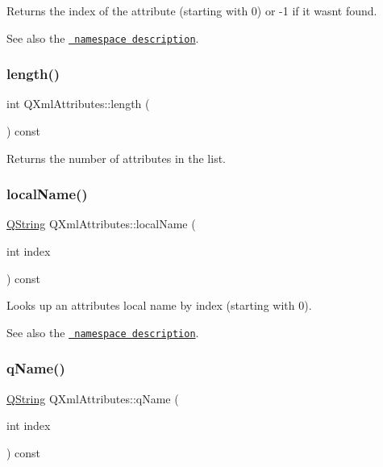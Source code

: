 Returns the index of the attribute (starting with 0) or -\/1 if it wasn\textquotesingle{}t found.

See also the \href{xml-sax.html\#namespaces}{\texttt{ namespace description}}. \mbox{\label{class_q_xml_attributes_aa36145f8c505f42637cf0afbf9862918}} 
\subsubsection{\texorpdfstring{length()}{length()}}
{\footnotesize\ttfamily int Q\+Xml\+Attributes\+::length (\begin{DoxyParamCaption}{ }\end{DoxyParamCaption}) const}

Returns the number of attributes in the list. \mbox{\label{class_q_xml_attributes_aac2045c7130627fffb30ae132d3e44ac}} 
\subsubsection{\texorpdfstring{localName()}{localName()}}
{\footnotesize\ttfamily \mbox{\hyperlink{class_q_string}{Q\+String}} Q\+Xml\+Attributes\+::local\+Name (\begin{DoxyParamCaption}\item[{int}]{index }\end{DoxyParamCaption}) const}

Looks up an attribute\textquotesingle{}s local name by index (starting with 0).

See also the \href{xml-sax.html\#namespaces}{\texttt{ namespace description}}. \mbox{\label{class_q_xml_attributes_a1dadc4d5470c544f9826f438d9aa3321}} 
\subsubsection{\texorpdfstring{qName()}{qName()}}
{\footnotesize\ttfamily \mbox{\hyperlink{class_q_string}{Q\+String}} Q\+Xml\+Attributes\+::q\+Name (\begin{DoxyParamCaption}\item[{int}]{index }\end{DoxyParamCaption}) const}

